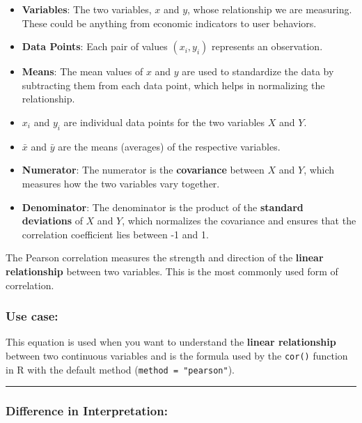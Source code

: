 \documentclass[
  12 pt,
  a4paper,
]{book}
\numberwithin{equation}{section}
\theoremstyle{plain}      %
\theoremstyle{definition} %
\theoremstyle{remark}     %
\theoremstyle{note}         %
\begin{document}
\begin{itemize}
\item
  \textbf{Variables}: The two variables, \(x\) and \(y\), whose
  relationship we are measuring. These could be anything from economic
  indicators to user behaviors.
\item
  \textbf{Data Points}: Each pair of values \((x_i, y_i)\) represents an
  observation.
\item
  \textbf{Means}: The mean values of \(x\) and \(y\) are used to
  standardize the data by subtracting them from each data point, which
  helps in normalizing the relationship.
\item
  \(x_i\) and \(y_i\) are individual data points for the two variables
  \(X\) and \(Y\).
\item
  \(\bar{x}\) and \(\bar{y}\) are the means (averages) of the respective
  variables.
\item
  \textbf{Numerator}: The numerator is the \textbf{covariance} between
  \(X\) and \(Y\), which measures how the two variables vary together.
\item
  \textbf{Denominator}: The denominator is the product of the
  \textbf{standard deviations} of \(X\) and \(Y\), which normalizes the
  covariance and ensures that the correlation coefficient lies between
  -1 and 1.
\end{itemize}

The Pearson correlation measures the strength and direction of the
\textbf{linear relationship} between two variables. This is the most
commonly used form of correlation.

\hypertarget{use-case}{%
\subsubsection{Use case:}\label{use-case}}

This equation is used when you want to understand the \textbf{linear
relationship} between two continuous variables and is the formula used
by the \texttt{cor()} function in R with the default method
(\texttt{method\ =\ "pearson"}).

\begin{center}\rule{0.5\linewidth}{0.5pt}\end{center}

\hypertarget{difference-in-interpretation}{%
\subsubsection{Difference in
Interpretation:}\label{difference-in-interpretation}}
\end{document}
